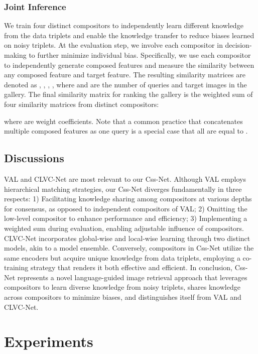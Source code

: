 \documentclass[sigconf]{acmart}
\begin{document}
\subsubsection{Joint Inference}
\label{subsubsec:joint_infer}
We train four distinct compositors to independently learn different knowledge from the data triplets and enable the knowledge transfer to reduce biases learned on noisy triplets. At the evaluation step, we involve each compositor in decision-making to further minimize individual bias. Specifically, we use each compositor to independently generate composed features and measure the similarity between any composed feature and target feature. The resulting similarity matrices are denoted as , , , , where  and  are the number of queries and target images in the gallery. The final similarity matrix for ranking the gallery is the weighted sum of four similarity matrices from distinct compositors:

where  are weight coefficients. Note that a common practice that concatenates multiple composed features as one query is a special case that all  are equal to .

\subsection{Discussions}
\label{subsec:discussion}

VAL \cite{chen2020image} and CLVC-Net \cite{wen2021comprehensive} are most relevant to our Css-Net. Although VAL employs hierarchical matching strategies, our Css-Net diverges fundamentally in three respects: 1) Facilitating knowledge sharing among compositors at various depths for consensus, as opposed to independent compositors of VAL; 2) Omitting the low-level compositor to enhance performance and efficiency; 3) Implementing a weighted sum during evaluation, enabling adjustable influence of compositors. CLVC-Net incorporates global-wise and local-wise learning through two distinct models, akin to a model ensemble. Conversely, compositors in Css-Net utilize the same encoders but acquire unique knowledge from data triplets, employing a co-training strategy that renders it both effective and efficient. In conclusion, Css-Net represents a novel language-guided image retrieval approach that leverages compositors to learn diverse knowledge from noisy triplets, shares knowledge across compositors to minimize biases, and distinguishes itself from VAL and CLVC-Net.

\section{Experiments} \label{experiments}
\end{document}
